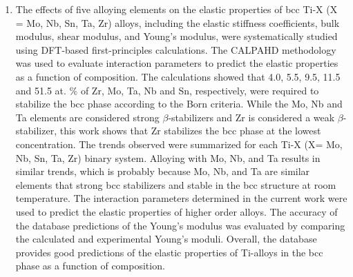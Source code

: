 \begin{enumerate}
	\item The effects of five alloying elements on the elastic properties of bcc Ti-X (X = Mo, Nb, Sn, Ta, Zr) alloys, including the elastic stiffness coefficients, bulk modulus, shear modulus, and Young's modulus, were systematically studied using DFT-based first-principles calculations. The CALPAHD methodology was used to evaluate interaction parameters to predict the elastic properties as a function of composition. The calculations showed that 4.0, 5.5, 9.5, 11.5 and 51.5 at. \% of Zr, Mo, Ta, Nb and Sn, respectively, were required to stabilize the bcc phase according to the Born criteria. While the Mo, Nb and Ta elements are considered strong $\beta$-stabilizers and Zr is considered a weak $\beta$-stabilizer, this work shows that Zr stabilizes the bcc phase at the lowest concentration. The trends observed were summarized for each Ti-X (X= Mo, Nb, Sn, Ta, Zr) binary system. Alloying with Mo, Nb, and Ta results in similar trends, which is probably because Mo, Nb, and Ta are similar elements that strong bcc stabilizers and stable in the bcc structure at room temperature. The interaction parameters determined in the current work were used to predict the elastic properties of higher order alloys. The accuracy of the database predictions of the Young's modulus was evaluated by comparing the calculated and experimental Young's moduli. Overall, the database provides good predictions of the elastic properties of Ti-alloys in the bcc phase as a function of composition.

\end{enumerate}
